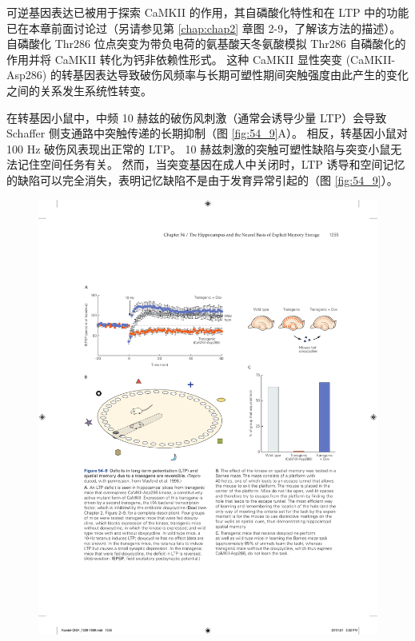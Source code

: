 可逆基因表达已被用于探索 CaMKII 的作用，其自磷酸化特性和在 LTP 中的功能已在本章前面讨论过（另请参见第 \ref{chap:chap2} 章图 2-9，了解该方法的描述）。
自磷酸化 Thr286 位点突变为带负电荷的氨基酸天冬氨酸模拟 Thr286 自磷酸化的作用并将 CaMKII 转化为钙非依赖性形式。
这种 CaMKII 显性突变 (CaMKII-Asp286) 的转基因表达导致破伤风频率与长期可塑性期间突触强度由此产生的变化之间的关系发生系统性转变。


在转基因小鼠中，中频 10 赫兹的破伤风刺激（通常会诱导少量 LTP）会导致 Schaffer 侧支通路中突触传递的长期抑制（图 \ref{fig:54_9}A）。
相反，转基因小鼠对 100 Hz 破伤风表现出正常的 LTP。 10 赫兹刺激的突触可塑性缺陷与突变小鼠无法记住空间任务有关。
然而，当突变基因在成人中关闭时，LTP 诱导和空间记忆的缺陷可以完全消失，表明记忆缺陷不是由于发育异常引起的（图 \ref{fig:54_9}）。


\begin{figure}[htbp]
	\centering
	\includegraphics[width=0.9\linewidth]{chap54/fig_54_9}

\end{figure}
